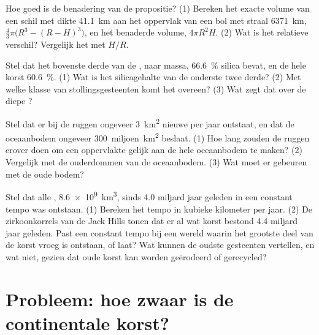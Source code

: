 \begin{exercise}[$\star\star\star$]\label{exo:g12:continental-crust:12}
Hoe goed is de benadering van de propositie? (1) Bereken het exacte
volume van een schil met dikte \qty{41.1}{km} aan het oppervlak van een bol met
straal \qty{6371}{km}, $\tfrac{4}{3}\pi\bigl(R^3 - (R - H)^3\bigr)$, en het
benaderde volume, $4\pi R^2 H$. (2) Wat is het relatieve verschil? Vergelijk
het met $H/R$.
\end{exercise}

\begin{exercise}[$\star\star\star$]\label{exo:g12:continental-crust:13}
Stel dat het bovenste derde van de , naar massa,
\qty{66.6}{\percent} silica bevat, en de hele korst \qty{60.6}{\percent}. (1)
Wat is het silicagehalte van de onderste twee derde? (2) Met welke klasse van
stollingsgesteenten komt het overeen? (3) Wat zegt dat over de diepe
?
\end{exercise}

\begin{exercise}[$\star\star\star$]\label{exo:g12:continental-crust:14}
Stel dat er bij de ruggen ongeveer \qty{3}{km^2} nieuwe  per
jaar ontstaat, en dat de oceaanbodem ongeveer \num{300}~miljoen~\unit{km^2} beslaat. (1)
Hoe lang zouden de ruggen erover doen om een oppervlakte gelijk aan de hele
oceaanbodem te maken? (2) Vergelijk met de ouderdommen van de oceaanbodem. (3) Wat moet er gebeuren met
de oude bodem?
\end{exercise}

\begin{exercise}[$\star\star\star$]\label{exo:g12:continental-crust:15}
Stel dat alle , \qty{8.6e9}{km^3}, sinds 4.0 miljard jaar geleden
in een constant tempo was ontstaan. (1) Bereken het tempo in kubieke kilometer per
jaar. (2) De zirkoonkorrels van de Jack Hills tonen dat er al wat korst bestond
4.4 miljard jaar geleden. Past een constant tempo bij een wereld waarin het grootste deel van de
korst vroeg is ontstaan, of laat? Wat kunnen de oudste gesteenten vertellen, en
wat niet, gezien dat oude korst kan worden geërodeerd of gerecycled?
\end{exercise}

\section{Probleem: hoe zwaar is de continentale korst?}


